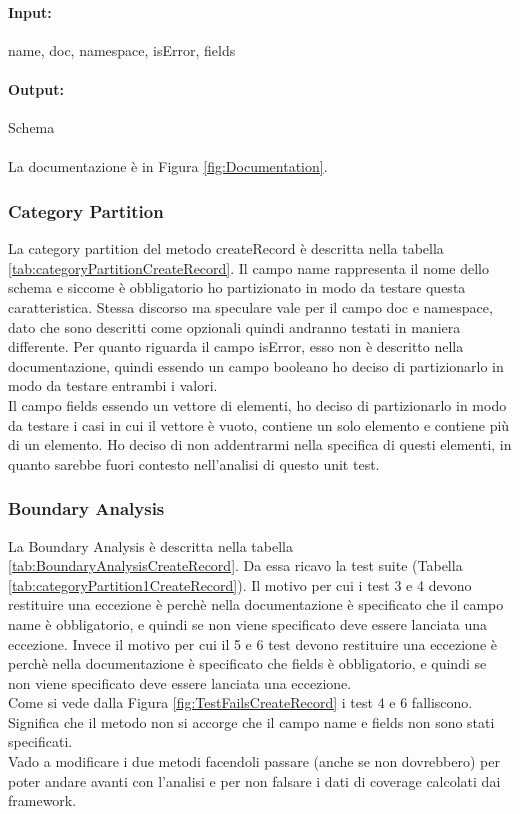 \documentclass[12pt, a4paper]{article}
\begin{document}
\paragraph{Input:} name, doc, namespace, isError, fields

\paragraph{Output:} Schema \\ \\
La documentazione è in Figura \ref{fig:Documentation}.

\subsubsection{Category Partition}
La category partition del metodo createRecord è descritta nella tabella \ref{tab:categoryPartitionCreateRecord}.
Il campo name rappresenta il nome dello schema e siccome è obbligatorio ho partizionato in modo da testare questa caratteristica.
Stessa discorso ma speculare vale per il campo doc e namespace, dato che sono descritti come opzionali 
quindi andranno testati in maniera differente.
Per quanto riguarda il campo isError, esso non è descritto nella documentazione, quindi essendo un campo booleano
ho deciso di partizionarlo in modo da testare entrambi i valori.\\
Il campo fields essendo un vettore di elementi, ho deciso di partizionarlo in modo da testare i casi in cui il vettore
è vuoto, contiene un solo elemento e contiene più di un elemento. Ho deciso di non addentrarmi nella specifica di 
questi elementi, in quanto sarebbe fuori contesto nell'analisi di questo unit test.
\subsubsection{Boundary Analysis}

La Boundary Analysis è descritta nella tabella \ref{tab:BoundaryAnalysisCreateRecord}. 
Da essa ricavo la test suite (Tabella \ref{tab:categoryPartition1CreateRecord}).
Il motivo per cui i test 3 e 4 devono restituire una eccezione è perchè nella documentazione è specificato che
il campo name è obbligatorio, e quindi se non viene specificato deve essere lanciata una eccezione.
Invece il motivo per cui il 5 e 6 test devono restituire una eccezione è perchè nella documentazione è specificato che
fields è obbligatorio, e quindi se non viene specificato deve essere lanciata una eccezione. \\
Come si vede dalla Figura \ref{fig:TestFailsCreateRecord} i test 4 e 6 falliscono. Significa che il metodo non si accorge
che il campo name e fields non sono stati specificati. \\
Vado a modificare i due metodi facendoli passare (anche se non dovrebbero) per poter andare avanti con l'analisi e 
per non falsare i dati di coverage calcolati dai framework.
\end{document}
